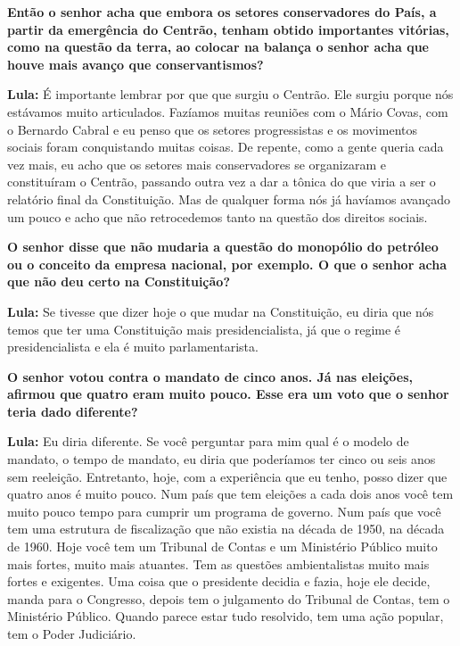 \textbf{Então o senhor acha que embora os setores conservadores do País,
a partir da emergência do Centrão, tenham obtido importantes vitórias,
como na questão da terra, ao colocar na balança o senhor acha que houve
mais avanço que conservantismos?}

\textbf{Lula:} É importante lembrar por que que surgiu o Centrão. Ele
surgiu porque nós estávamos muito articulados. Fazíamos muitas reuniões
com o Mário Covas, com o Bernardo Cabral e eu penso que os setores
progressistas e os movimentos sociais foram conquistando muitas coisas.
De repente, como a gente queria cada vez mais, eu acho que os setores
mais conservadores se organizaram e constituíram o Centrão, passando
outra vez a dar a tônica do que viria a ser o relatório final da
Constituição. Mas de qualquer forma nós já havíamos avançado um pouco e
acho que não retrocedemos tanto na questão dos direitos sociais.

\textbf{O senhor disse que não mudaria a questão do monopólio do
petróleo ou o conceito da empresa nacional, por exemplo. O que o senhor
acha que não deu certo na Constituição?}

\textbf{Lula:} Se tivesse que dizer hoje o que mudar na Constituição, eu
diria que nós temos que ter uma Constituição mais presidencialista, já
que o regime é presidencialista e ela é muito parlamentarista.

\textbf{O senhor votou contra o mandato de cinco anos. Já nas eleições,
afirmou que quatro eram muito pouco. Esse era um voto que o senhor teria
dado diferente?}

\textbf{Lula:} Eu diria diferente. Se você perguntar para mim qual é o
modelo de mandato, o tempo de mandato, eu diria que poderíamos ter cinco
ou seis anos sem reeleição. Entretanto, hoje, com a experiência que eu
tenho, posso dizer que quatro anos é muito pouco. Num país que tem
eleições a cada dois anos você tem muito pouco tempo para cumprir um
programa de governo. Num país que você tem uma estrutura de fiscalização
que não existia na década de 1950, na década de 1960. Hoje você tem um
Tribunal de Contas e um Ministério Público muito mais fortes, muito mais
atuantes. Tem as questões ambientalistas muito mais fortes e exigentes.
Uma coisa que o presidente decidia e fazia, hoje ele decide, manda para
o Congresso, depois tem o julgamento do Tribunal de Contas, tem o
Ministério Público. Quando parece estar tudo resolvido, tem uma ação
popular, tem o Poder Judiciário.

